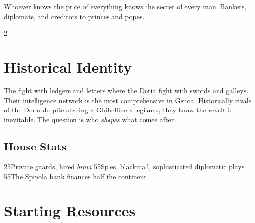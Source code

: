 
%
  {Whoever knows the price of everything knows the secret of every man.}%
  {Bankers, diplomats, and creditors to princes and popes.}

\begin{multicols}{2}

\section{Historical Identity}

The  fight with ledgers and letters where the Doria fight with
swords and galleys. Their intelligence network is the most comprehensive in
Genoa. Historically rivals of the Doria despite sharing a Ghibelline
allegiance, they know the revolt is inevitable. The question is who
\textit{shapes} what comes after.

\columnbreak

\subsection{House Stats}

    {2}{5}{Private guards, hired \textit{bravi}}
 {5}{5}{Spies, blackmail, sophisticated diplomatic plays}
 {5}{5}{The Spinola bank finances half the continent}

\end{multicols}

\section{Starting Resources}

